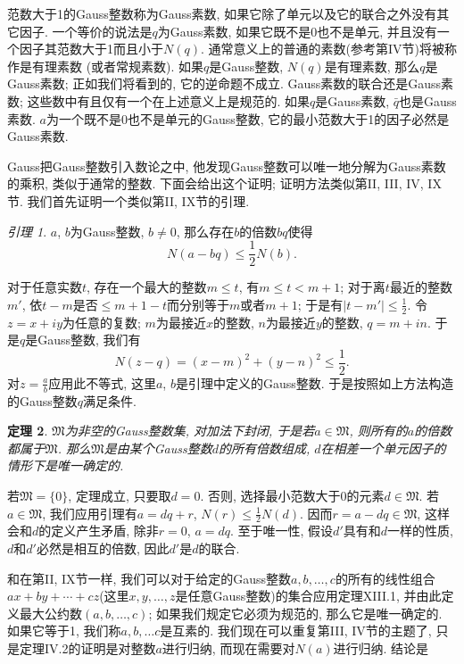 \documentclass[12pt,a4paper]{book} %
\newtheorem{theorem}{定理}
\theoremstyle{remark}
\theoremstyle{example}
\theoremstyle{lemma}
\newtheorem{lemma}[theorem]{引理}
\theoremstyle{corollary}
\numberwithin{theorem}{chapter}
\begin{document}
范数大于1的Gauss整数称为Gauss素数, 如果它除了单元以及它的联合之外没有其它因子. 一个等价的说法是$q$为Gauss素数, 如果它既不是0也不是单元, 并且没有一个因子其范数大于1而且小于$N(q)$. 通常意义上的普通的素数(参考第IV节)将被称作是有理素数 (或者常规素数). 如果$q$是Gauss整数, $N(q)$是有理素数, 那么$q$是Gauss素数; 正如我们将看到的, 它的逆命题不成立. Gauss素数的联合还是Gauss素数; 这些数中有且仅有一个在上述意义上是规范的. 如果$q$是Gauss素数, $\bar{q}$也是Gauss素数. $a$为一个既不是0也不是单元的Gauss整数, 它的最小范数大于1的因子必然是Gauss素数.

Gauss把Gauss整数引入数论之中, 他发现Gauss整数可以唯一地分解为Gauss素数的乘积, 类似于通常的整数. 下面会给出这个证明; 证明方法类似第II, III, IV, IX节. 我们首先证明一个类似第II, IX节的引理.

\begin{lemma}
$a$, $b$为Gauss整数, $b \neq 0$, 那么存在$b$的倍数$bq$使得
\[
N(a - bq) \le \frac{1}{2}N(b).
\]
\end{lemma}

对于任意实数$t$, 存在一个最大的整数$m \le t$, 有$m \le t < m + 1$; 对于离$t$最近的整数$m'$, 依$t - m$是否$\le m + 1 - t$而分别等于$m$或者$m + 1$; 于是有$|t - m'| \le \frac{1}{2}$. 令$z = x + iy$为任意的复数; $m$为最接近$x$的整数, $n$为最接近$y$的整数, $q = m + in$. 于是$q$是Gauss整数, 我们有
\[
N(z - q) = (x - m)^2 + (y - n)^2 \le \frac{1}{2}.
\]
对$z = \frac{a}{b}$应用此不等式, 这里$a$, $b$是引理中定义的Gauss整数. 于是按照如上方法构造的Gauss整数$q$满足条件.

\begin{theorem}
$\mathfrak{M}$为非空的Gauss整数集, 对加法下封闭, 于是若$a \in \mathfrak{M}$, 则所有的$a$的倍数都属于$\mathfrak{M}$. 那么$\mathfrak{M}$是由某个Gauss整数$d$的所有倍数组成, $d$在相差一个单元因子的情形下是唯一确定的.
\end{theorem}

若$\mathfrak{M} = \{0\}$, 定理成立, 只要取$d = 0$. 否则, 选择最小范数大于0的元素$d \in \mathfrak{M}$. 若$a \in \mathfrak{M}$, 我们应用引理有$a = dq + r$, $N(r) \le \frac{1}{2}N(d)$. 因而$r = a - dq \in \mathfrak{M}$, 这样会和$d$的定义产生矛盾, 除非$r = 0$, $a = dq$. 至于唯一性, 假设$d'$具有和$d$一样的性质, $d$和$d'$必然是相互的倍数, 因此$d'$是$d$的联合.

和在第II, IX节一样, 我们可以对于给定的Gauss整数$a, b, \ldots, c$的所有的线性组合$ax + by + \cdots + cz$(这里$x, y, \ldots, z$是任意Gauss整数)的集合应用定理XIII.1, 并由此定义最大公约数$(a, b, \ldots, c)$; 如果我们规定它必须为规范的, 那么它是唯一确定的. 如果它等于1, 我们称$a, b, \ldots c$是互素的. 我们现在可以重复第III, IV节的主题了, 只是定理IV.2的证明是对整数$a$进行归纳, 而现在需要对$N(a)$进行归纳. 结论是
\end{document}
